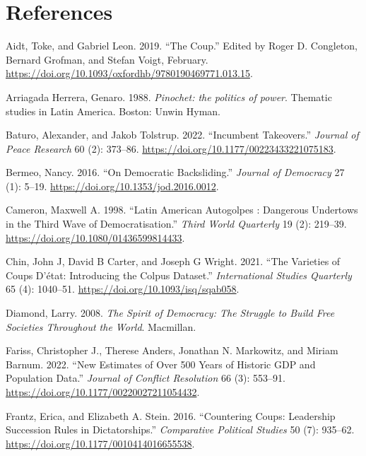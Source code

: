 \documentclass[
  12pt,
]{report}
\newlength{\cslhangindent}
\newenvironment{CSLReferences}[2] %
 {\begin{list}{}{%
  \setlength{\itemindent}{0pt}
  \setlength{\leftmargin}{0pt}
  \setlength{\parsep}{0pt}
  \ifodd #1
   \setlength{\leftmargin}{\cslhangindent}
   \setlength{\itemindent}{-1\cslhangindent}
  \fi
  \setlength{\itemsep}{#2\baselineskip}}}
 {\end{list}}
\begin{document}
\newpage

\chapter*{References}\label{references}

\label{refs}
\begin{CSLReferences}{1}{0}
Aidt, Toke, and Gabriel Leon. 2019. {``The Coup.''} Edited by Roger D.
Congleton, Bernard Grofman, and Stefan Voigt, February.
\url{https://doi.org/10.1093/oxfordhb/9780190469771.013.15}.

Arriagada Herrera, Genaro. 1988. \emph{Pinochet: the politics of power}.
Thematic studies in Latin America. Boston: Unwin Hyman.

Baturo, Alexander, and Jakob Tolstrup. 2022. {``Incumbent Takeovers.''}
\emph{Journal of Peace Research} 60 (2): 373--86.
\url{https://doi.org/10.1177/00223433221075183}.

Bermeo, Nancy. 2016. {``On Democratic Backsliding.''} \emph{Journal of
Democracy} 27 (1): 5--19. \url{https://doi.org/10.1353/jod.2016.0012}.

Cameron, Maxwell A. 1998. {``Latin American Autogolpes : Dangerous
Undertows in the Third Wave of Democratisation.''} \emph{Third World
Quarterly} 19 (2): 219--39.
\url{https://doi.org/10.1080/01436599814433}.

Chin, John J, David B Carter, and Joseph G Wright. 2021. {``The
Varieties of Coups D{'}état: Introducing the Colpus Dataset.''}
\emph{International Studies Quarterly} 65 (4): 1040--51.
\url{https://doi.org/10.1093/isq/sqab058}.

Diamond, Larry. 2008. \emph{The Spirit of Democracy: The Struggle to
Build Free Societies Throughout the World}. Macmillan.

Fariss, Christopher J., Therese Anders, Jonathan N. Markowitz, and
Miriam Barnum. 2022. {``New Estimates of Over 500 Years of Historic GDP
and Population Data.''} \emph{Journal of Conflict Resolution} 66 (3):
553--91. \url{https://doi.org/10.1177/00220027211054432}.

Frantz, Erica, and Elizabeth A. Stein. 2016. {``Countering Coups:
Leadership Succession Rules in Dictatorships.''} \emph{Comparative
Political Studies} 50 (7): 935--62.
\url{https://doi.org/10.1177/0010414016655538}.


\end{CSLReferences}
\end{document}
